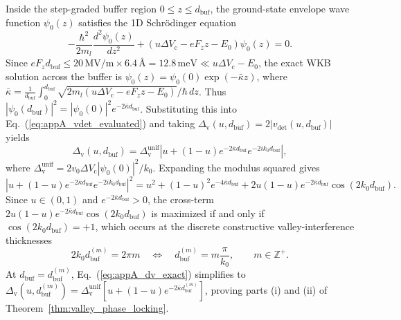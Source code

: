\documentclass[11pt,letterpaper]{article}
\theoremstyle{definition}
\begin{document}
Inside the step-graded buffer region $0 \le z \le d_{\mathrm{buf}}$, the ground-state envelope wave function $\psi_0(z)$ satisfies the 1D Schr\"odinger equation
\begin{equation}
  -\frac{\hbar^2}{2m_l} \frac{d^2 \psi_0(z)}{dz^2} + \left( u \Delta V_{\mathrm{c}} - e F_z z - E_0 \right) \psi_0(z) = 0.
  \label{eq:appA_buffer_schrodinger}
\end{equation}
Since $e F_z d_{\mathrm{buf}} \le 20\,\mathrm{MV/m} \times 6.4\,\text{\AA} = 12.8\,\mathrm{meV} \ll u \Delta V_{\mathrm{c}} - E_0$, the exact WKB solution across the buffer is $\psi_0(z) = \psi_0(0) \exp(-\bar{\kappa} z)$, where $\bar{\kappa} = \frac{1}{d_{\mathrm{buf}}}\int_0^{d_{\mathrm{buf}}} \sqrt{2m_l(u\Delta V_{\mathrm{c}} - e F_z z - E_0)}/\hbar\,dz$. Thus $|\psi_0(d_{\mathrm{buf}})|^2 = |\psi_0(0)|^2 e^{-2\bar{\kappa} d_{\mathrm{buf}}}$. Substituting this into Eq.~(\ref{eq:appA_vdet_evaluated}) and taking $\Delta_{\mathrm{v}}(u, d_{\mathrm{buf}}) = 2|v_{\mathrm{det}}(u, d_{\mathrm{buf}})|$ yields
\begin{equation}
  \Delta_{\mathrm{v}}(u, d_{\mathrm{buf}}) = \Delta_{\mathrm{v}}^{\mathrm{unif}} \left| u + (1 - u) e^{-2\bar{\kappa} d_{\mathrm{buf}}} e^{-2i k_0 d_{\mathrm{buf}}} \right|,
  \label{eq:appA_dv_exact}
\end{equation}
where $\Delta_{\mathrm{v}}^{\mathrm{unif}} = 2 v_0 \Delta V_{\mathrm{c}} |\psi_0(0)|^2 / k_0$. Expanding the modulus squared gives
\begin{equation}
  \left| u + (1 - u) e^{-2\bar{\kappa} d_{\mathrm{buf}}} e^{-2i k_0 d_{\mathrm{buf}}} \right|^2 = u^2 + (1 - u)^2 e^{-4\bar{\kappa} d_{\mathrm{buf}}} + 2u(1 - u) e^{-2\bar{\kappa} d_{\mathrm{buf}}} \cos(2k_0 d_{\mathrm{buf}}).
  \label{eq:appA_modulus_squared}
\end{equation}
Since $u \in (0,1)$ and $e^{-2\bar{\kappa} d_{\mathrm{buf}}} > 0$, the cross-term $2u(1-u)e^{-2\bar{\kappa} d_{\mathrm{buf}}}\cos(2k_0 d_{\mathrm{buf}})$ is maximized if and only if $\cos(2k_0 d_{\mathrm{buf}}) = +1$, which occurs at the discrete constructive valley-interference thicknesses
\begin{equation}
  2k_0 d_{\mathrm{buf}}^{(m)} = 2\pi m \quad \Longleftrightarrow \quad d_{\mathrm{buf}}^{(m)} = m \frac{\pi}{k_0}, \qquad m \in \mathbb{Z}^+.
  \label{eq:appA_node_condition}
\end{equation}
At $d_{\mathrm{buf}} = d_{\mathrm{buf}}^{(m)}$, Eq.~(\ref{eq:appA_dv_exact}) simplifies to $\Delta_{\mathrm{v}}(u, d_{\mathrm{buf}}^{(m)}) = \Delta_{\mathrm{v}}^{\mathrm{unif}} [u + (1-u)e^{-2\bar{\kappa} d_{\mathrm{buf}}^{(m)}}]$, proving parts (i) and (ii) of Theorem~\ref{thm:valley_phase_locking}.
\end{document}
